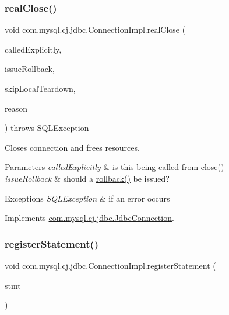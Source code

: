 \subsubsection{\texorpdfstring{real\+Close()}{realClose()}}
{\footnotesize\ttfamily void com.\+mysql.\+cj.\+jdbc.\+Connection\+Impl.\+real\+Close (\begin{DoxyParamCaption}\item[{boolean}]{called\+Explicitly,  }\item[{boolean}]{issue\+Rollback,  }\item[{boolean}]{skip\+Local\+Teardown,  }\item[{Throwable}]{reason }\end{DoxyParamCaption}) throws S\+Q\+L\+Exception}

Closes connection and frees resources.


\begin{DoxyParams}{Parameters}
{\em called\+Explicitly} & is this being called from \mbox{\hyperlink{classcom_1_1mysql_1_1cj_1_1jdbc_1_1_connection_impl_a9d82246a207b618a8ce3dfcf349c971d}{close()}} \\
\hline
{\em issue\+Rollback} & should a \mbox{\hyperlink{classcom_1_1mysql_1_1cj_1_1jdbc_1_1_connection_impl_adb29692483164e8c98dbeb9c6eb5a972}{rollback()}} be issued? \\
\hline
\end{DoxyParams}

\begin{DoxyExceptions}{Exceptions}
{\em S\+Q\+L\+Exception} & if an error occurs \\
\hline
\end{DoxyExceptions}


Implements \mbox{\hyperlink{interfacecom_1_1mysql_1_1cj_1_1jdbc_1_1_jdbc_connection}{com.\+mysql.\+cj.\+jdbc.\+Jdbc\+Connection}}.

\mbox{\label{classcom_1_1mysql_1_1cj_1_1jdbc_1_1_connection_impl_a34559497cf5a4650696890f1de8a0a78}} 
\subsubsection{\texorpdfstring{register\+Statement()}{registerStatement()}}
{\footnotesize\ttfamily void com.\+mysql.\+cj.\+jdbc.\+Connection\+Impl.\+register\+Statement (\begin{DoxyParamCaption}\item[{\mbox{\hyperlink{interfacecom_1_1mysql_1_1cj_1_1jdbc_1_1_jdbc_statement}{Jdbc\+Statement}}}]{stmt }\end{DoxyParamCaption})}

